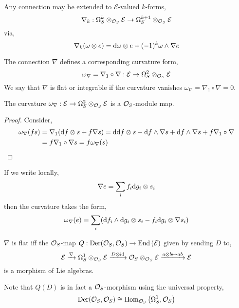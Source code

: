\documentclass[12pt]{article}
\begin{document}
\begin{remark}
Any connection may be extended to $\mathcal{E}$-valued $k$-forms,
\[ \nabla_k : \Omega_S^k \otimes_{\mathcal{O}_{S}} \mathcal{E} \to \Omega^{k + 1}_S \otimes_{\mathcal{O}_{S}} \mathcal{E} \]
via,
\[ \nabla_k (\omega \otimes e) = \mathrm{d}{\omega} \otimes e + (-1)^k \omega \wedge \nabla e \]
\end{remark}

\begin{definition}
The connection $\nabla$ defines a corresponding curvature form,
\[ \omega_\nabla = \nabla_1 \circ \nabla : \mathcal{E} \to \Omega^2_S \otimes_{\mathcal{O}_{S}} \mathcal{E} \]
We say that $\nabla$ is flat or integrable if the curvature vanishes $\omega_\nabla = \nabla_1 \circ \nabla = 0$. 
\end{definition}

\begin{lemma}
The curvature $\omega_\nabla : \mathcal{E} \to \Omega^2_S \otimes_{\mathcal{O}_{S}} \mathcal{E}$ is a $\mathcal{O}_{S}$-module map.
\end{lemma}

\begin{proof}
Consider,
\begin{align*}
\omega_\nabla(f s) & = \nabla_1 (\mathrm{d}{f} \otimes s + f \nabla s) = \mathrm{d}{\mathrm{d}{f}} \otimes s - \mathrm{d}{f} \wedge \nabla s + \mathrm{d}{f} \wedge \nabla s + f \nabla_1 \circ \nabla 
\\
& = f \nabla_1 \circ \nabla s = f \omega_\nabla (s) 
\end{align*} 
\end{proof}

\begin{remark}
If we write locally,
\[ \nabla e = \sum_i f_i \mathrm{d}{g_i} \otimes s_i \]
then the curvature takes the form,
\[ \omega_\nabla (e) = \sum_{i} (\mathrm{d}{f_i} \wedge \mathrm{d}{g_i} \otimes s_i - f_i \mathrm{d}{g_i} \otimes \nabla s_i) \]
\end{remark}

\begin{proposition}
$\nabla$ is flat iff the $\mathcal{O}_{S}$-map $Q : \mathrm{Der}(\mathcal{O}_{S}, \mathcal{O}_{S}) \to \mathrm{End} \left( \mathcal{E} \right)$ given by sending $D$ to,
\[ \mathcal{E} \xrightarrow{\nabla} \Omega^1_S \otimes_{\mathcal{O}_{S}} \mathcal{E} \xrightarrow{D \otimes \mathrm{id}} \mathcal{O}_{S} \otimes_{\mathcal{O}_{S}} \mathcal{E} \xrightarrow{a \otimes b \mapsto ab} \mathcal{E} \]
is a morphism of Lie algebras.
\end{proposition}

\begin{remark}
Note that $Q(D)$ is in fact a $\mathcal{O}_{S}$-morphism using the universal property,
\[ \mathrm{Der}(\mathcal{O}_{S}, \mathcal{O}_{S}) \cong \mathrm{Hom}_{\mathcal{O}_{S}} \left( \Omega^1_S, \mathcal{O}_{S} \right) \]
\end{remark}
\end{document}
